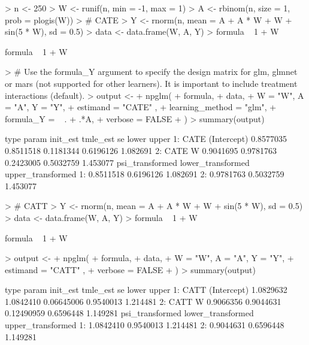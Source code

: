 \documentclass{article}
\begin{document}
\begin{Schunk}
\begin{Sinput}
> n <- 250
> W <- runif(n, min = -1,  max = 1)
> A <- rbinom(n, size = 1, prob = plogis(W))
> # CATE
> Y <- rnorm(n, mean = A + A * W + W + sin(5 * W), sd = 0.5)
> data <- data.frame(W, A, Y)
> formula ~ 1 + W
\end{Sinput}
\begin{Soutput}
formula ~ 1 + W
\end{Soutput}
\begin{Sinput}
> # Use the formula_Y argument to specify the design matrix for glm, glmnet or mars (not supported for other learners). It is important to include treatment interactions (default).
> output <-
+   npglm(
+     formula,
+     data,
+     W = "W", A = "A", Y = "Y",
+     estimand = "CATE" ,
+     learning_method = "glm",
+     formula_Y = ~ . + .*A,
+     verbose = FALSE
+   )
> summary(output)
\end{Sinput}
\begin{Soutput}
   type       param  init_est  tmle_est        se     lower    upper
1: CATE (Intercept) 0.8577035 0.8511518 0.1181344 0.6196126 1.082691
2: CATE           W 0.9041695 0.9781763 0.2423005 0.5032759 1.453077
   psi_transformed lower_transformed upper_transformed
1:       0.8511518         0.6196126          1.082691
2:       0.9781763         0.5032759          1.453077
\end{Soutput}
\begin{Sinput}
> # CATT
> Y <- rnorm(n, mean = A + A * W + W + sin(5 * W), sd = 0.5)
> data <- data.frame(W, A, Y)
> formula ~ 1 + W
\end{Sinput}
\begin{Soutput}
formula ~ 1 + W
\end{Soutput}
\begin{Sinput}
> output <-
+   npglm(
+     formula,
+     data,
+     W = "W", A = "A", Y = "Y",
+     estimand = "CATT" ,
+     verbose = FALSE
+   )
> summary(output)
\end{Sinput}
\begin{Soutput}
   type       param  init_est  tmle_est         se     lower    upper
1: CATT (Intercept) 1.0829632 1.0842410 0.06645006 0.9540013 1.214481
2: CATT           W 0.9066356 0.9044631 0.12490959 0.6596448 1.149281
   psi_transformed lower_transformed upper_transformed
1:       1.0842410         0.9540013          1.214481
2:       0.9044631         0.6596448          1.149281
\end{Soutput}
\begin{Sinput}

\end{Sinput}
\end{Schunk}
\end{document}
